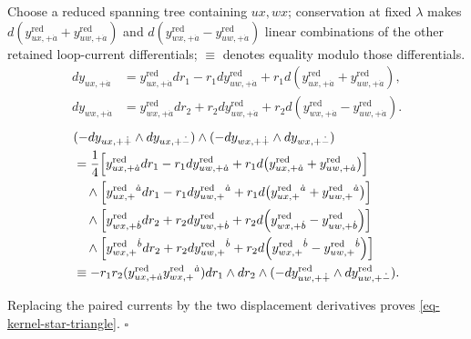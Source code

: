 \documentclass[11pt]{article}
\numberwithin{equation}{section}
\numberwithin{figure}{section}
\numberwithin{table}{section}
\begin{document}
\begin{proofbox}
Choose a reduced spanning tree containing $ux,wx$; conservation at fixed $\lambda$ makes $d(y_{ux,+\dot a}^{\mathrm{red}}+y_{uw,+\dot a}^{\mathrm{red}})$ and $d(y_{wx,+\dot a}^{\mathrm{red}}-y_{uw,+\dot a}^{\mathrm{red}})$ linear combinations of the other retained loop-current differentials; $\equiv$ denotes equality modulo those differentials.
\begin{equation*}
\begin{aligned}
dy_{ux,+\dot a}
&=y_{ux,+\dot a}^{\mathrm{red}}dr_1-r_1dy_{uw,+\dot a}^{\mathrm{red}}
+r_1d\!\left(y_{ux,+\dot a}^{\mathrm{red}}+y_{uw,+\dot a}^{\mathrm{red}}\right),\\
dy_{wx,+\dot a}
&=y_{wx,+\dot a}^{\mathrm{red}}dr_2+r_2dy_{uw,+\dot a}^{\mathrm{red}}
+r_2d\!\left(y_{wx,+\dot a}^{\mathrm{red}}-y_{uw,+\dot a}^{\mathrm{red}}\right).
\end{aligned}
\end{equation*}
\begin{equation*}
\begin{aligned}
&(-dy_{ux,+\dot+}\wedge dy_{ux,+\dot-})\wedge
(-dy_{wx,+\dot+}\wedge dy_{wx,+\dot-})\\
&=\frac14\Bigl[y_{ux,+\dot a}^{\mathrm{red}}dr_1-r_1dy_{uw,+\dot a}^{\mathrm{red}}
+r_1d\!\left(y_{ux,+\dot a}^{\mathrm{red}}+y_{uw,+\dot a}^{\mathrm{red}}\right)\Bigr]\\
&\quad\wedge\Bigl[y_{ux,+}^{\mathrm{red}}{}^{\dot a}dr_1-r_1dy_{uw,+}^{\mathrm{red}}{}^{\dot a}
+r_1d\!\left(y_{ux,+}^{\mathrm{red}}{}^{\dot a}+y_{uw,+}^{\mathrm{red}}{}^{\dot a}\right)\Bigr]\\
&\quad\wedge\Bigl[y_{wx,+\dot b}^{\mathrm{red}}dr_2+r_2dy_{uw,+\dot b}^{\mathrm{red}}
+r_2d\!\left(y_{wx,+\dot b}^{\mathrm{red}}-y_{uw,+\dot b}^{\mathrm{red}}\right)\Bigr]\\
&\quad\wedge\Bigl[y_{wx,+}^{\mathrm{red}}{}^{\dot b}dr_2+r_2dy_{uw,+}^{\mathrm{red}}{}^{\dot b}
+r_2d\!\left(y_{wx,+}^{\mathrm{red}}{}^{\dot b}-y_{uw,+}^{\mathrm{red}}{}^{\dot b}\right)\Bigr]\\
&\equiv-r_1r_2(y_{ux,+\dot a}^{\mathrm{red}}y_{wx,+}^{\mathrm{red}}{}^{\dot a})
dr_1\wedge dr_2\wedge
(-dy_{uw,+\dot+}^{\mathrm{red}}\wedge dy_{uw,+\dot-}^{\mathrm{red}}).
\end{aligned}
\end{equation*}

Replacing the paired currents by the two displacement derivatives proves \eqref{eq-kernel-star-triangle}. $\square$
\end{proofbox}
\end{document}
